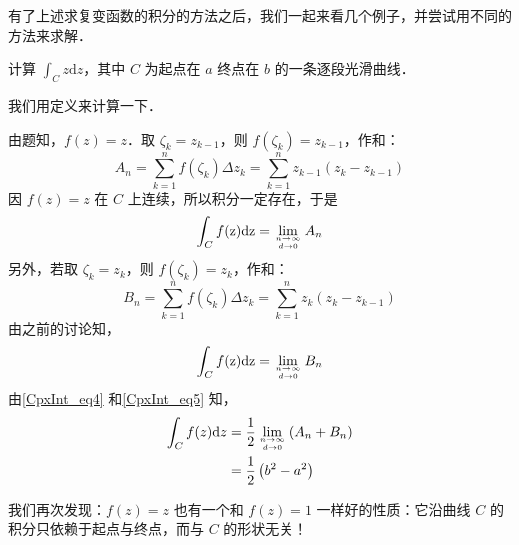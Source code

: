 有了上述求复变函数的积分的方法之后，我们一起来看几个例子，并尝试用不同的方法来求解．
\begin{example}{}
计算 $\displaystyle \int _ C z \mathrm dz$，其中 $C$ 为起点在 $a$ 终点在 $b$ 的一条逐段光滑曲线．

我们用定义来计算一下．

由题知，$f(z)=z$．取 $\zeta_k=z_{k-1}$，则 $f\left(\zeta_{k}\right)=z_{k-1}$，作和：
\begin{equation}
A_{n}=\sum_{k=1}^{n} f\left(\zeta_{k}\right) \Delta z_{k}=\sum_{k=1}^{n} z_{k-1}\left(z_{k}-z_{k-1}\right)
\end{equation}
因 $f(z)=z$ 在 $C$ 上连续，所以积分一定存在，于是
\begin{equation} \label{CpxInt_eq4}
\int_{C} f(\mathrm{z}) \mathrm{d} \mathrm{z}=\lim _{n \rightarrow \infty \atop d \rightarrow 0} A_{n}
\end{equation}
另外，若取 $\zeta_k=z_k$，则 $f\left(\zeta_{k}\right)=z_{k}$，作和：
\begin{equation}
B_{n}=\sum_{k=1}^{n} f\left(\zeta_{k}\right) \Delta z_{k}=\sum_{k=1}^{n} z_{k}\left(z_{k}-z_{k-1}\right)
\end{equation}
由之前的讨论知，
\begin{equation}\label{CpxInt_eq5}
\int_{C} f(\mathrm{z}) \mathrm{d} \mathrm{z}=\lim _{n \rightarrow \infty \atop d \rightarrow 0} B_{n}
\end{equation}
由\autoref{CpxInt_eq4} 和\autoref{CpxInt_eq5} 知，
\begin{equation}
\begin{aligned} \int_{C} f(z) \mathrm{d} z &=\frac{1}{2} \lim _{n \rightarrow \infty \atop d \rightarrow 0}\left(A_{n}+B_{n}\right) \\ &=\frac{1}{2}\left(b^{2}-a^{2}\right) \end{aligned}
\end{equation}
\end{example}
我们再次发现：$f (z) = z$ 也有一个和 $f(z)=1$ 一样好的性质：它沿曲线 $C$ 的积分只依赖于起点与终点，而与 $C $ 的形状无关！

